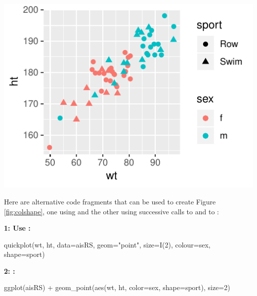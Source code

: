 \begin{marginfigure}[-72pt]
\begin{Schunk}


\centerline{\includegraphics[width=\textwidth]{figs/07-quick-rs1-1} }

\end{Schunk}
\caption{Use \texttt{color} for distinguishing \texttt{sex}es,
\texttt{shape}s for \texttt{sport}s.}\label{fig:colshape}

\end{marginfigure}

Here are alternative code fragments that can be used to create
Figure \ref{fig:colshape}, one using  and the other
using successive calls to  and to :
\vspace*{9pt}

\begin{fullwidth}
\begin{minipage}[t]{0.36\linewidth}
{\bf 1: Use :}
\begin{Schunk}
\begin{Sinput}
quickplot(wt, ht,
          data=aisRS,
          geom="point",
          size=I(2),
          colour=sex,
          shape=sport)
\end{Sinput}
\end{Schunk}
\end{minipage}
\hspace*{0.04\textwidth}
\begin{minipage}[t]{0.4\linewidth}
{\bf 2: :}
\begin{Schunk}
\begin{Sinput}
ggplot(aisRS) +
  geom_point(aes(wt, ht,
               color=sex,
               shape=sport),
             size=2)
\end{Sinput}
\end{Schunk}
\end{minipage}
\end{fullwidth}


